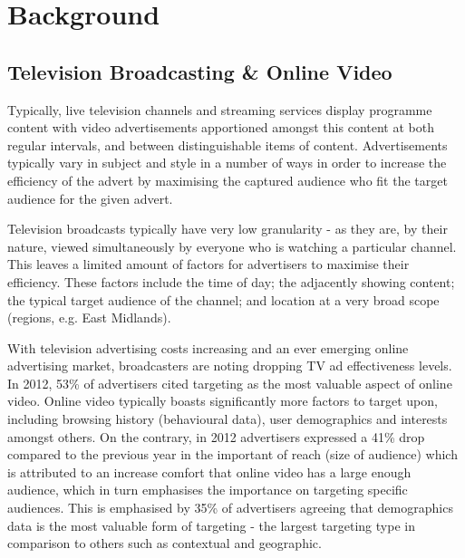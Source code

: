\section{Background}

	\subsection{Television Broadcasting \& Online Video}

	Typically, live television channels and streaming services display programme content with video advertisements apportioned amongst this content at both regular intervals, and between distinguishable items of content. Advertisements typically vary in subject and style in a number of ways in order to increase the efficiency of the advert by maximising the captured audience who fit the target audience for the given advert.

	Television broadcasts typically have very low granularity - as they are, by their nature, viewed simultaneously by everyone who is watching a particular channel. This leaves a limited amount of factors for advertisers to maximise their efficiency. These factors include the time of day; the adjacently showing content; the typical target audience of the channel; and location at a very broad scope (regions, e.g. East Midlands).

	With television advertising costs increasing and an ever emerging online advertising market, broadcasters are noting dropping TV ad effectiveness levels. In 2012, 53\% of advertisers cited targeting as the most valuable aspect of online video. Online video typically boasts significantly more factors to target upon, including browsing history (behavioural data), user demographics and interests amongst others. On the contrary, in 2012 advertisers expressed a 41\% drop compared to the previous year in the important of reach (size of audience) which is attributed to an increase comfort that online video has a large enough audience, which in turn emphasises the importance on targeting specific audiences. This is emphasised by 35\% of advertisers agreeing that demographics data is the most valuable form of targeting - the largest targeting type in comparison to others such as contextual and geographic. \citep{brightroll-report}


